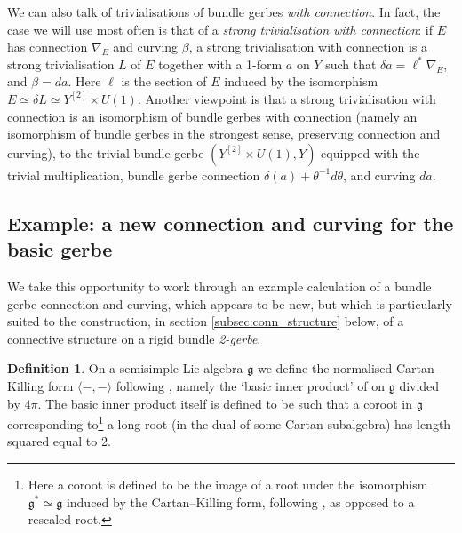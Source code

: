 \documentclass[12pt]{amsart}
\theoremstyle{plain}
\theoremstyle{definition}
\newtheorem{definition}[theorem]{Definition}
\theoremstyle{remark}
\numberwithin{equation}{section}
\renewcommand{\d}{\delta}
\newcommand{\g}{\mathfrak g}
\newcommand{\<}{\langle}
\renewcommand{\>}{\rangle}
\begin{document}
We can also talk of trivialisations of bundle gerbes \emph{with connection}. In fact, the case we will use most often is that of a \emph{strong trivialisation with connection}: if $E$ has connection $\nabla_E$ and curving $\beta$, a strong trivialisation with connection is a strong trivialisation $L$ of $E$ together with a 1-form $a$ on $Y$ such that $\delta a = \ell^*\nabla_E$, and $\beta=da$. Here $\ell$ is the section of $E$ induced by the isomorphism $E \simeq \d L\simeq Y^{[2]}\times U(1)$.
Another viewpoint is that a strong trivialisation with connection is an isomorphism of bundle gerbes with connection (namely an isomorphism of bundle gerbes in the strongest sense, preserving connection and curving), to the trivial bundle gerbe $(Y^{[2]}\times U(1),Y)$ equipped with the trivial multiplication, bundle gerbe connection $\delta(a)+\theta^{-1}d\theta$, and curving $da$.



\subsection{Example: a new connection and curving for the basic gerbe}\label{sec:new_example}

We take this opportunity to work through an example calculation of a bundle gerbe connection and curving, which appears to be new, but which is particularly suited to the construction, in section \ref{subsec:conn_structure} below, of a connective structure on a rigid bundle \emph{2-gerbe}.


\begin{definition}\label{def:Killing_normalised}
On a semisimple Lie algebra $\g$ we define the normalised Cartan--Killing form $\langle-,-\rangle$ following \cite{BSCS}, namely the `basic inner product' of \cite[\S 4.4]{PS} on $\g$ divided by $4\pi$.
The basic inner product itself is defined to be such that a coroot in $\g$ corresponding to\footnote{Here a coroot is defined to be the image of a root under the isomorphism $\g^*\simeq \g$ induced by the Cartan--Killing form, following \cite{PS}, as opposed to a rescaled root.} a long root (in the dual of some Cartan subalgebra) has length squared equal to 2.
\end{definition}
\end{document}
